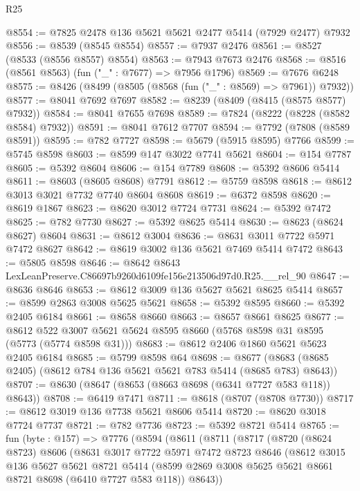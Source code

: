 \begin{lexlean}{R25}
\begin{coremodule}
@8554 := @7825 @2478 @136 @5621 @5621 @2477 @5414 (@7929 @2477) @7932
@8556 := @8539 (@8545 @8554)
@8557 := @7937 @2476
@8561 := @8527 (@8533 (@8556 @8557) @8554)
@8563 := @7943 @7673 @2476
@8568 := @8516 (@8561 @8563) (fun ("_" : @7677) => @7956 @1796)
@8569 := @7676 @6248
@8575 := @8426 (@8499 (@8505 (@8568 (fun ("_" : @8569) => @7961)) @7932))
@8577 := @8041 @7692 @7697
@8582 := @8239 (@8409 (@8415 (@8575 @8577) @7932))
@8584 := @8041 @7655 @7698
@8589 := @7824 (@8222 (@8228 (@8582 @8584) @7932))
@8591 := @8041 @7612 @7707
@8594 := @7792 (@7808 (@8589 @8591))
@8595 := @782 @7727
@8598 := @5679 (@5915 @8595) @7766
@8599 := @5745 @8598
@8603 := @8599 @147 @3022 @7741 @5621
@8604 := @154 @7787
@8605 := @5392 @8604
@8606 := @154 @7789
@8608 := @5392 @8606 @5414
@8611 := @8603 (@8605 @8608) @7791
@8612 := @5759 @8598
@8618 := @8612 @3013 @3021 @7732 @7740 @8604 @8608
@8619 := @6372 @8598
@8620 := @8619 @1867
@8623 := @8620 @3012 @7724 @7731
@8624 := @5392 @7472
@8625 := @782 @7730
@8627 := @5392 @8625 @5414
@8630 := @8623 (@8624 @8627) @8604
@8631 := @8612 @3004
@8636 := @8631 @3011 @7722 @5971 @7472 @8627
@8642 := @8619 @3002 @136 @5621 @7469 @5414 @7472
@8643 := @5805 @8598
@8646 := @8642 @8643 LexLeanPreserve.C86697b9260d6109fe156e213506d97d0.R25.__rel_90
@8647 := @8636 @8646
@8653 := @8612 @3009 @136 @5627 @5621 @8625 @5414
@8657 := @8599 @2863 @3008 @5625 @5621
@8658 := @5392 @8595
@8660 := @5392 @2405 @6184
@8661 := @8658 @8660
@8663 := @8657 @8661 @8625
@8677 := @8612 @522 @3007 @5621 @5624 @8595 @8660 (@5768 @8598 @31 @8595 (@5773 (@5774 @8598 @31)))
@8683 := @8612 @2406 @1860 @5621 @5623 @2405 @6184
@8685 := @5799 @8598 @64
@8698 := @8677 (@8683 (@8685 @2405) (@8612 @784 @136 @5621 @5621 @783 @5414 (@8685 @783) @8643))
@8707 := @8630 (@8647 (@8653 (@8663 @8698 (@6341 @7727 @583 @118)) @8643))
@8708 := @6419 @7471
@8711 := @8618 (@8707 (@8708 @7730))
@8717 := @8612 @3019 @136 @7738 @5621 @8606 @5414
@8720 := @8620 @3018 @7724 @7737
@8721 := @782 @7736
@8723 := @5392 @8721 @5414
@8765 := fun (byte : @157) =>
  @7776
    (@8594
      (@8611
        (@8711
          (@8717
            (@8720
              (@8624 @8723)
              @8606
              (@8631
                @3017
                @7722
                @5971
                @7472
                @8723
                @8646
                (@8612
                  @3015
                  @136
                  @5627
                  @5621
                  @8721
                  @5414
                  (@8599 @2869 @3008 @5625 @5621 @8661 @8721 @8698 (@6410 @7727 @583 @118))
                  @8643))

\end{coremodule}
\end{lexlean}
